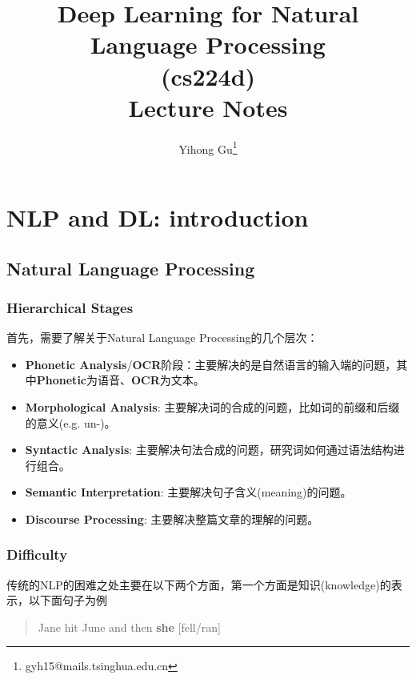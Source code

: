 \documentclass{article}
\title{Deep Learning for Natural Language Processing \\ (cs224d) \\ Lecture Notes}
\author{\large Yihong Gu\footnote{gyh15@mails.tsinghua.edu.cn}}
\date{}
\begin{document}
\maketitle

\tableofcontents

\newpage

\section{NLP and DL: introduction}

\subsection{Natural Language Processing}

\subsubsection*{Hierarchical Stages}

首先，需要了解关于Natural Language Processing的几个层次：

\begin{itemize}
	\item \textbf{Phonetic Analysis}/\textbf{OCR}阶段：主要解决的是自然语言的输入端的问题，其中\textbf{Phonetic}为语音、\textbf{OCR}为文本。
	\item \textbf{Morphological Analysis}: 主要解决词的合成的问题，比如词的前缀和后缀的意义(e.g. un-)。
	\item \textbf{Syntactic Analysis}: 主要解决句法合成的问题，研究词如何通过语法结构进行组合。
	\item \textbf{Semantic Interpretation}: 主要解决句子含义(meaning)的问题。
	\item \textbf{Discourse Processing}: 主要解决整篇文章的理解的问题。
\end{itemize}

\subsubsection*{Difficulty}

传统的NLP的困难之处主要在以下两个方面，第一个方面是知识(knowledge)的表示，以下面句子为例

\begin{center}
\begin{quote}
Jane hit June and then \textbf{she} [fell/ran]
\end{quote}
\end{center}
\end{document}

